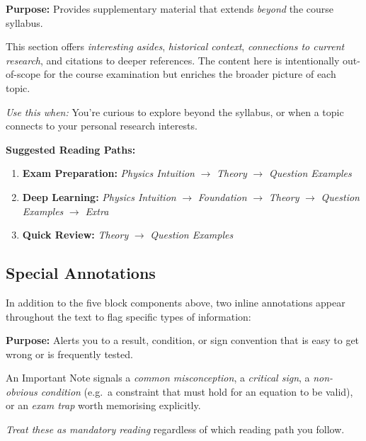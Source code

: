 \noindent
\begin{minipage}{0.9\textwidth}
  \begin{tcolorbox}[breakable, colback=GrayBG, colframe=SlateGray,
                     leftrule=2pt, rightrule=2pt, arc=3pt,
                     before upper={\textcolor{SlateGray}{\textbf{\scshape Extra}}\par\smallskip}]
    \textbf{Purpose:} Provides supplementary material that extends \emph{beyond}
    the course syllabus.

    This section offers \emph{interesting asides}, \emph{historical context},
    \emph{connections to current research}, and citations to deeper references.
    The content here is intentionally out-of-scope for the course examination
    but enriches the broader picture of each topic.

    \smallskip
    \textit{Use this when:} You're curious to explore beyond the syllabus, or when a topic
    connects to your personal research interests.
  \end{tcolorbox}
\end{minipage}

\newpage

\noindent\textbf{Suggested Reading Paths:}
\begin{enumerate}
  \item \textbf{Exam Preparation:} \textit{Physics Intuition} $\to$
        \textit{Theory} $\to$ \textit{Question Examples}
  \item \textbf{Deep Learning:} \textit{Physics Intuition} $\to$ \textit{Foundation}
        $\to$ \textit{Theory} $\to$ \textit{Question Examples} $\to$ \textit{Extra}
  \item \textbf{Quick Review:} \textit{Theory} $\to$ \textit{Question Examples}
\end{enumerate}

\bigskip \bigskip
\subsection*{Special Annotations}

In addition to the five block components above, two inline annotations appear
throughout the text to flag specific types of information:

\bigskip

\noindent
\begin{minipage}{0.9\textwidth}
  \begin{importantnote}
    \textbf{Purpose:} Alerts you to a result, condition, or sign convention that is
    easy to get wrong or is frequently tested.

    An Important Note signals a \emph{common misconception}, a \emph{critical sign},
    a \emph{non-obvious condition} (e.g.\ a constraint that must hold for an
    equation to be valid), or an \emph{exam trap} worth memorising explicitly.

    \smallskip
    \textit{Treat these as mandatory reading} regardless of which reading path you follow.
  \end{importantnote}
\end{minipage}

